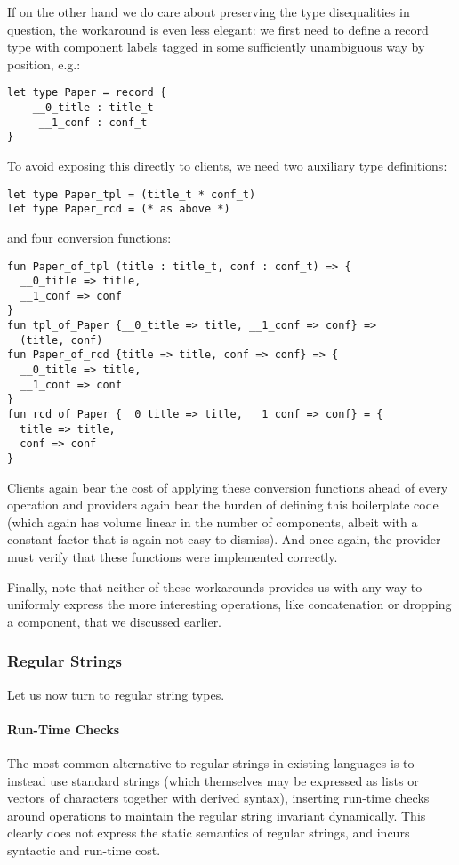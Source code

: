 If on the other hand we do care about preserving the type disequalities in question, the workaround is even less elegant: we first need to define a record type with component labels tagged in some sufficiently unambiguous way by position, e.g.:
\begin{lstlisting}[numbers=none]
let type Paper = record {
	__0_title : title_t
	 __1_conf : conf_t 
}\end{lstlisting}
To avoid exposing this directly to clients, we need two auxiliary type definitions:
\begin{lstlisting}[numbers=none]
let type Paper_tpl = (title_t * conf_t)
let type Paper_rcd = (* as above *)
\end{lstlisting}
and four conversion functions:
\begin{lstlisting}[numbers=none]
fun Paper_of_tpl (title : title_t, conf : conf_t) => {
  __0_title => title,
  __1_conf => conf
}
fun tpl_of_Paper {__0_title => title, __1_conf => conf} => 
  (title, conf)
fun Paper_of_rcd {title => title, conf => conf} => {
  __0_title => title,
  __1_conf => conf
}
fun rcd_of_Paper {__0_title => title, __1_conf => conf} = {
  title => title,
  conf => conf
}
\end{lstlisting}
Clients again bear the cost of applying these conversion functions ahead of every operation and providers again bear the burden of defining this boilerplate code (which again has volume linear in the number of components, albeit with a constant factor that is again not easy to dismiss). And once again, the provider must verify that these functions were implemented correctly. %

Finally, note that neither of these workarounds provides us with any way to uniformly express the more interesting operations, like  concatenation or dropping a component, that we discussed earlier.

\subsubsection{Regular Strings}
Let us now turn to regular string types.

\paragraph{Run-Time Checks}
The most common alternative to regular strings in existing languages is to instead use standard strings (which themselves may be expressed as lists or vectors of characters together with derived syntax), inserting run-time checks around operations to maintain the regular string invariant dynamically. This clearly does not express the static semantics of regular strings, and incurs syntactic and run-time cost.

